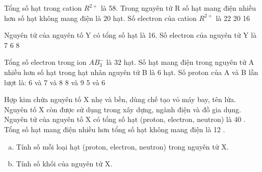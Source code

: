 \begin{ex}[2]
	Tổng số hạt trong cation $ R^{2+} $ là 58. Trong nguyên tử R số hạt mang điện nhiều hơn số hạt không mang điện là 20 hạt. Số electron của cation $ R^{2+} $ là
	\choice
	{%
	}
	{%
		22
	}
	{%
		20
	}
	{%
		16
	}
\end{ex}

\begin{ex}[2]
	Nguyên tử của nguyên tố Y có tổng số hạt là 16. Số electron của nguyên tử Y là
	\choice
	{%
		7
	}
	{%
		6
	}
	{%
	}
	{%
		8
	}
\end{ex}

\begin{ex}[3]
	Tổng số electron trong ion $ AB_{3}^{-} $ là $ 32 $ hạt. Số hạt mang điện trong nguyên tử A nhiều hơn số hạt trong hạt nhân nguyên tử B là 6 hạt. Số proton của A và B lần lượt là:
	\choice
	{%
		6 và 7
	}
	{%
		 và 8
	}
	{%
		8 và 9
	}
	{%
		5 và 6
	}
\end{ex}

\begin{bt}
	Hợp kim chứa nguyên tố $\mathrm{X}$ nhẹ và bền, dùng chế tạo vỏ máy bay, tên lửa. Nguyên tố $\mathrm{X}$ còn được sử dụng trong xây dựng, ngành điện và đồ gia dụng. Nguyên tử của nguyên tố $\mathrm{X}$ có tổng số hạt (proton, electron, neutron) là 40 . Tổng số hạt mang điện nhiều hơn tổng số hạt không mang điện là 12 .
	\begin{enumerate}[a)]
		\item Tính số mỗi loại hạt (proton, electron, neutron) trong nguyên tử $\mathrm{X}$.
		\item Tính số khối của nguyên tử $\mathrm{X}$.
	\end{enumerate}
\end{bt}
